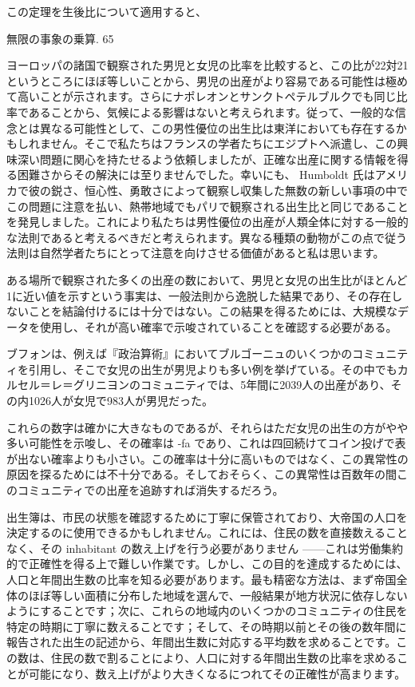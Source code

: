 \documentclass[a4paper,11pt,openany]{ltjsbook}
\begin{document}
この定理を生後比について適用すると、

無限の事象の乗算. 65

ヨーロッパの諸国で観察された男児と女児の比率を比較すると、この比が22対21というところにほぼ等しいことから、男児の出産がより容易である可能性は極めて高いことが示されます。さらにナポレオンとサンクトペテルブルクでも同じ比率であることから、気候による影響はないと考えられます。従って、一般的な信念とは異なる可能性として、この男性優位の出生比は東洋においても存在するかもしれません。そこで私たちはフランスの学者たちにエジプトへ派遣し、この興味深い問題に関心を持たせるよう依頼しましたが、正確な出産に関する情報を得る困難さからその解決には至りませんでした。幸いにも、 Humboldt 氏はアメリカで彼の鋭さ、恒心性、勇敢さによって観察し収集した無数の新しい事項の中でこの問題に注意を払い、熱帯地域でもパリで観察される出生比と同じであることを発見しました。これにより私たちは男性優位の出産が人類全体に対する一般的な法則であると考えるべきだと考えられます。異なる種類の動物がこの点で従う法則は自然学者たちにとって注意を向けさせる価値があると私は思います。

ある場所で観察された多くの出産の数において、男児と女児の出生比がほとんど1に近い値を示すという事実は、一般法則から逸脱した結果であり、その存在しないことを結論付けるには十分ではない。この結果を得るためには、大規模なデータを使用し、それが高い確率で示唆されていることを確認する必要がある。

ブフォンは、例えば『政治算術』においてブルゴーニュのいくつかのコミュニティを引用し、そこで女児の出生が男児よりも多い例を挙げている。その中でもカルセル＝レ＝グリニヨンのコミュニティでは、5年間に2039人の出産があり、その内1026人が女児で983人が男児だった。

これらの数字は確かに大きなものであるが、それらはただ女児の出生の方がやや多い可能性を示唆し、その確率は -fa であり、これは四回続けてコイン投げで表が出ない確率よりも小さい。この確率は十分に高いものではなく、この異常性の原因を探るためには不十分である。そしておそらく、この異常性は百数年の間このコミュニティでの出産を追跡すれば消失するだろう。

出生簿は、市民の状態を確認するために丁寧に保管されており、大帝国の人口を決定するのに使用できるかもしれません。これには、住民の数を直接数えることなく、その inhabitant の数え上げを行う必要がありません ——これは労働集約的で正確性を得る上で難しい作業です。しかし、この目的を達成するためには、人口と年間出生数の比率を知る必要があります。最も精密な方法は、まず帝国全体のほぼ等しい面積に分布した地域を選んで、一般結果が地方状況に依存しないようにすることです；次に、これらの地域内のいくつかのコミュニティの住民を特定の時期に丁寧に数えることです；そして、その時期以前とその後の数年間に報告された出生の記述から、年間出生数に対応する平均数を求めることです。この数は、住民の数で割ることにより、人口に対する年間出生数の比率を求めることが可能になり、数え上げがより大きくなるにつれてその正確性が高まります。
\end{document}
